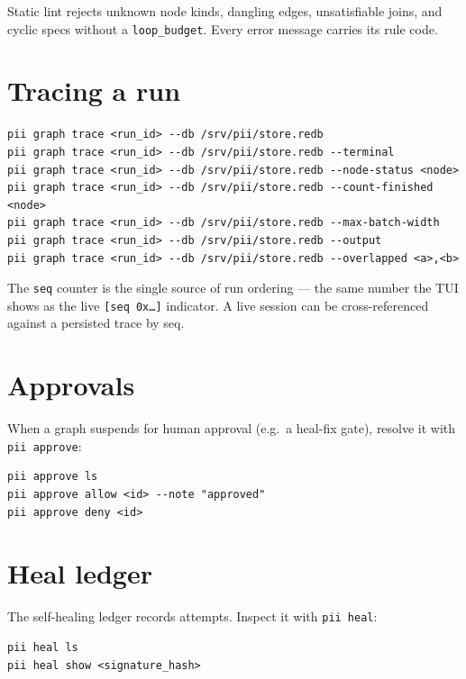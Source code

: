 \documentclass[
	fontsize=10pt,
	twoside=false,
	secnumdepth=2,
	open=any,
]{kaobook}
\begin{document}
Static lint rejects unknown node kinds, dangling edges, unsatisfiable
joins, and cyclic specs without a \texttt{loop\_budget}. Every error
message carries its rule code.

\section{Tracing a run}

\begin{cmdbox}[Trace]
\begin{lstlisting}
pii graph trace <run_id> --db /srv/pii/store.redb
pii graph trace <run_id> --db /srv/pii/store.redb --terminal
pii graph trace <run_id> --db /srv/pii/store.redb --node-status <node>
pii graph trace <run_id> --db /srv/pii/store.redb --count-finished <node>
pii graph trace <run_id> --db /srv/pii/store.redb --max-batch-width
pii graph trace <run_id> --db /srv/pii/store.redb --output
pii graph trace <run_id> --db /srv/pii/store.redb --overlapped <a>,<b>
\end{lstlisting}
\end{cmdbox}

The \texttt{seq} counter is the single source of run ordering — the same
number the TUI shows as the live \texttt{[seq 0x\ldots]} indicator. A live
session can be cross-referenced against a persisted trace by seq.

\section{Approvals}

When a graph suspends for human approval (e.g.\ a heal-fix gate), resolve
it with \texttt{pii approve}:

\begin{cmdbox}[Approve]
\begin{lstlisting}
pii approve ls
pii approve allow <id> --note "approved"
pii approve deny <id>
\end{lstlisting}
\end{cmdbox}

\section{Heal ledger}

The self-healing ledger records attempts. Inspect it with
\texttt{pii heal}:

\begin{cmdbox}[Heal]
\begin{lstlisting}
pii heal ls
pii heal show <signature_hash>
\end{lstlisting}
\end{cmdbox}
\end{document}
